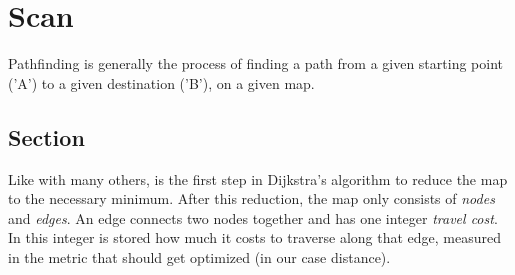 \chapter{Scan}\label{ch:scan}
Pathfinding is generally the process of finding a path from a given starting point ('A')
to a given destination ('B'),
on a given map.

\section{Section}\label{sec:sec}
Like with many others,
is the first step in Dijkstra's algorithm to reduce the map to the necessary minimum.
After this reduction, the map only consists of \emph{nodes} and \emph{edges}.
An edge connects two nodes together and has one integer \emph{travel cost}.
In this integer is stored how much it costs to traverse along that edge,
measured in the metric that should get optimized (in our case distance).
